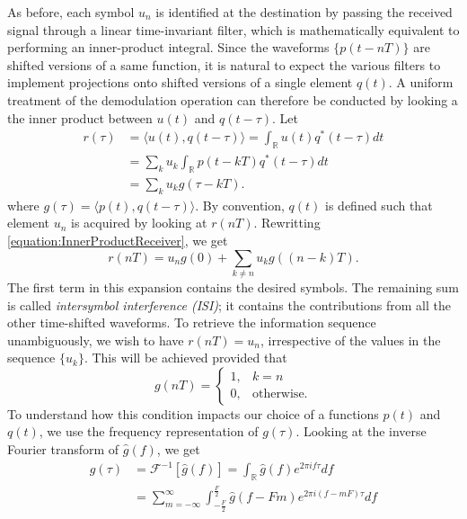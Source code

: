 As before, each symbol $u_n$ is identified at the destination by passing the received signal through a linear time-invariant filter, which is mathematically equivalent to performing an inner-product integral.
Since the waveforms $\{ p(t-nT) \}$ are shifted versions of a same function, it is natural to expect the various filters to implement projections onto shifted versions of a single element $q(t)$.
A uniform treatment of the demodulation operation can therefore be conducted by looking a the inner product between $u(t)$ and $q(t-\tau)$.
Let
\begin{equation} \label{equation:InnerProductReceiver}
\begin{split}
r(\tau) &= \langle u(t), q(t-\tau) \rangle
= \int_{\mathbb{R}} u(t) q^*(t-\tau) dt \\
&= \sum_{k} u_k \int_{\mathbb{R}} p(t - kT) q^*(t-\tau) dt \\
&= \sum_{k} u_k g(\tau - kT) .
\end{split}
\end{equation}
where $g(\tau) = \langle p(t), q(t-\tau) \rangle$.
By convention, $q(t)$ is defined such that element $u_n$ is acquired by looking at $r(nT)$.
Rewritting \eqref{equation:InnerProductReceiver}, we get
\begin{equation*}
r(nT) = u_n g(0) + \sum_{k \neq n} u_k g((n - k)T) .
\end{equation*}
The first term in this expansion contains the desired symbols.
The remaining sum is called \emph{intersymbol interference (ISI)}; it contains the contributions from all the other time-shifted waveforms.
To retrieve the information sequence unambiguously, we wish to have $r(nT) = u_n$, irrespective of the values in the sequence $\{ u_k \}$.
This will be achieved provided that
\begin{equation} \label{equation:NoInterSymbolInterferenceSpecification}
g(nT) = \begin{cases} 1, & k = n \\
0, & \text{otherwise} . \end{cases}
\end{equation}
To understand how this condition impacts our choice of a functions $p(t)$ and $q(t)$, we use the frequency representation of $g(\tau)$.
Looking at the inverse Fourier transform of $\hat{g}(f)$, we get
\begin{equation*}
\begin{split}
g(\tau) &= \mathcal{F}^{-1} \left[ \hat{g} (f) \right]
= \int_{\mathbb{R}} \hat{g}(f) e^{2 \pi i f \tau} df \\
&= \sum_{m = -\infty}^{\infty} \int_{-\frac{F}{2}}^{\frac{F}{2}}
\hat{g} (f - Fm) e^{2 \pi i (f - mF) \tau} df
\end{split}
\end{equation*}
